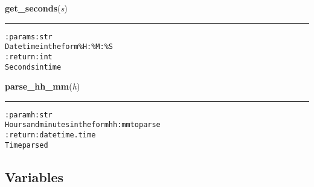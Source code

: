     \vspace{0.5ex}

\hspace{.8\funcindent}\begin{boxedminipage}{\funcwidth}

    \raggedright \textbf{get\_seconds}(\textit{s})

    \vspace{-1.5ex}

    \rule{\textwidth}{0.5\fboxrule}
\setlength{\parskip}{2ex}
\begin{alltt}

:param s: str
    Datetime in the form \%H:\%M:\%S
:return: int
    Seconds in time
\end{alltt}

\setlength{\parskip}{1ex}
    \end{boxedminipage}

    \label{hal:time:utils:parse_hh_mm}

    \vspace{0.5ex}

\hspace{.8\funcindent}\begin{boxedminipage}{\funcwidth}

    \raggedright \textbf{parse\_hh\_mm}(\textit{h})

    \vspace{-1.5ex}

    \rule{\textwidth}{0.5\fboxrule}
\setlength{\parskip}{2ex}
\begin{alltt}

:param h: str
    Hours and minutes in the form hh:mm to parse
:return: datetime.time
    Time parsed
\end{alltt}

\setlength{\parskip}{1ex}
    \end{boxedminipage}



  \subsection{Variables}

